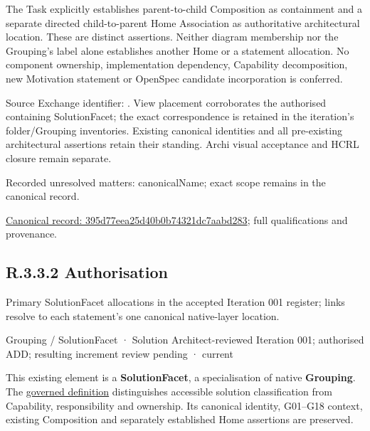 The Task explicitly establishes parent-to-child Composition as containment and
a separate directed child-to-parent Home Association as authoritative architectural
location. These are distinct assertions. Neither diagram membership nor the
Grouping's label alone establishes another Home or a statement allocation.
No component ownership, implementation dependency, Capability decomposition,
new Motivation statement or OpenSpec candidate incorporation is conferred.



Source Exchange identifier: \texttt{}. View placement corroborates
the authorised containing SolutionFacet; the exact correspondence is retained in the
iteration's folder/Grouping inventories. Existing canonical identities and all
pre-existing architectural assertions retain their standing. Archi visual
acceptance and HCRL closure remain separate.


{\small Recorded unresolved matters: canonicalName; exact scope remains in the canonical record.}\par
{\footnotesize \href{../../../../../../../continuum/grouping/395d77eea25d40b0b74321dc7aabd283.md}{Canonical record: 395d77eea25d40b0b74321dc7aabd283}; full qualifications and provenance.}\par
\subsection*{R.3.3.2 Authorisation}
\label{navigation:R.3.3.2}

Primary SolutionFacet allocations in the accepted Iteration 001 register; links resolve to each statement’s one canonical native-layer location.\par
\label{element:4648cf5a1f8e4333978c13efae10eaa5}
{\small Grouping / SolutionFacet · Solution Architect-reviewed Iteration 001; authorised ADD; resulting increment review pending · current}\par

This existing element is a \textbf{SolutionFacet}, a specialisation of native
\textbf{Grouping}. The \href{\detokenize{../../../../../../../governance/continuum-representation.md#solutionfacet-classification--1119-candidate}}{governed definition}
distinguishes accessible solution classification from Capability, responsibility
and ownership. Its canonical identity, G01–G18 context, existing Composition
and separately established Home assertions are preserved.




